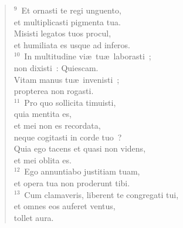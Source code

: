 \begin{flushleft}
\begin{verse}
${}^{9}$~Et ornasti te regi unguento,\\ et multiplicasti pigmenta tua.\\ Misisti legatos tuos procul,\\ et humiliata es usque ad inferos.\\
${}^{10}$~In multitudine vi\ae\ tu\ae\ laborasti~;\\ non dixisti~: Quiescam.\\ Vitam manus tu\ae\ invenisti~;\\ propterea non rogasti.\\
${}^{11}$~Pro quo sollicita timuisti,\\ quia mentita es,\\ et mei non es recordata,\\ neque cogitasti in corde tuo~?\\ Quia ego tacens et quasi non videns,\\ et mei oblita es.\\
${}^{12}$~Ego annuntiabo justitiam tuam,\\ et opera tua non proderunt tibi.\\
${}^{13}$~Cum clamaveris, liberent te congregati tui,\\ et omnes eos auferet ventus,\\ tollet aura.\end{verse}\end{flushleft}

